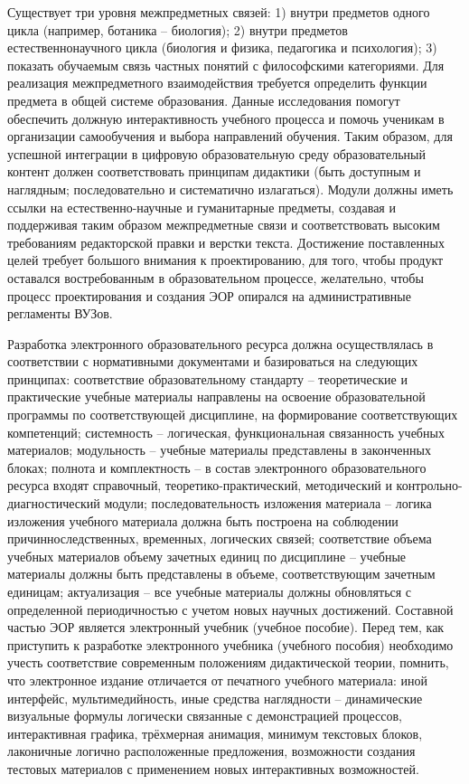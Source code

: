 Существует три уровня межпредметных связей: 1) внутри предметов одного цикла (например, ботаника -- биология); 2) внутри предметов естественнонаучного цикла (биология и физика, педагогика и психология); 3) показать обучаемым связь частных понятий с философскими категориями.
Для реализация межпредметного взаимодействия требуется определить функции предмета в общей системе образования.
Данные исследования помогут обеспечить должную интерактивность учебного процесса и помочь ученикам в организации самообучения и выбора направлений обучения\cite{6}.
Таким образом, для успешной интеграции в цифровую образовательную среду образовательный контент должен соответствовать принципам дидактики (быть доступным и наглядным; последовательно и систематично излагаться).
Модули должны иметь ссылки на естественно-научные и гуманитарные предметы, создавая и поддерживая таким образом межпредметные связи и соответствовать высоким требованиям редакторской правки и верстки текста.
Достижение поставленных целей требует большого внимания к проектированию, для того, чтобы продукт оставался востребованным в образовательном процессе, желательно, чтобы процесс проектирования и создания ЭОР опирался на административные регламенты ВУЗов.

Разработка электронного образовательного ресурса должна осуществлялась в соответствии с нормативными документами и базироваться на следующих принципах:
соответствие образовательному стандарту – теоретические и практические учебные материалы направлены на освоение образовательной программы по соответствующей дисциплине, на формирование соответствующих компетенций;
системность – логическая, функциональная связанность учебных материалов;
модульность – учебные материалы представлены в законченных блоках;
полнота и комплектность – в состав электронного образовательного ресурса входят справочный, теоретико-практический, методический и контрольно-диагностический модули;
последовательность изложения материала – логика изложения учебного материала должна быть построена на соблюдении причинноследственных, временных, логических связей;
соответствие объема учебных материалов объему зачетных единиц по дисциплине – учебные материалы должны быть представлены в объеме, соответствующим зачетным единицам;
актуализация – все учебные материалы должны обновляться с определенной периодичностью с учетом новых научных достижений.
Составной частью ЭОР является электронный учебник (учебное пособие).
Перед тем, как приступить к разработке электронного учебника (учебного пособия) необходимо учесть соответствие современным положениям дидактической теории, помнить, что электронное издание отличается от печатного учебного материала: иной интерфейс, мультимедийность, иные средства наглядности – динамические визуальные формулы логически связанные с демонстрацией процессов, интерактивная графика, трёхмерная анимация, минимум текстовых блоков, лаконичные логично расположенные предложения, возможности создания тестовых материалов с применением новых интерактивных возможностей\cite{7}.